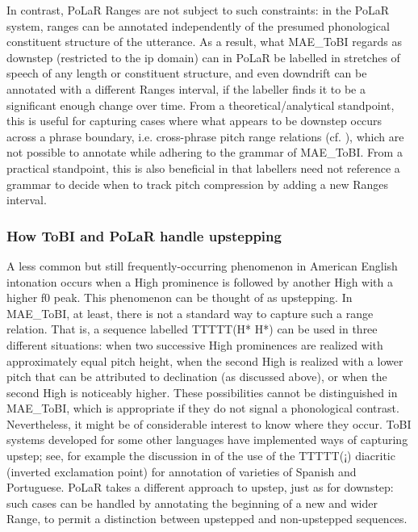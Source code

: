 \documentclass[11pt, twoside]{memoir}
\begin{document}
In contrast, PoLaR Ranges are not subject to such constraints: in the PoLaR system, ranges can be annotated independently of the presumed phonological constituent structure of the utterance. As a result, what MAE\_ToBI regards as downstep (restricted to the ip domain) can in PoLaR be labelled in stretches of speech of any length or constituent structure, and even downdrift can be annotated with a different Ranges interval, if the labeller finds it to be a significant enough change over time. From a theoretical\slash analytical standpoint, this is useful for capturing cases where what appears to be downstep occurs across a phrase boundary, i.e. cross-phrase pitch range relations (cf. \citealt{ladd88, brugos15}), which are not possible to annotate while adhering to the grammar of MAE\_ToBI. From a practical standpoint, this is also beneficial in that labellers need not reference a grammar to decide when to track pitch compression by adding a new Ranges interval.

\subsubsection{How ToBI and PoLaR handle upstepping}\label{sec:upstepping}
A less common but still frequently-occurring phenomenon in American English intonation occurs when a High prominence is followed by another High with a higher f0 peak.  This phenomenon can be thought of as upstepping. In MAE\_ToBI, at least, there is not a standard way to capture such a range relation.  That is, a sequence labelled TTTTT(H* H*) can be used in three different situations: when two successive High prominences are realized with approximately equal pitch height, when the second High is realized with a lower pitch that can be attributed to declination (as discussed above), or when the second High is noticeably higher. These possibilities cannot be distinguished in MAE\_ToBI, which is appropriate if they do not signal a phonological contrast. Nevertheless, it might be of considerable interest to know where they occur. ToBI systems developed for some other languages have implemented ways of capturing upstep; see, for example the discussion in \citet{armstrong-14} of the use of the TTTTT(¡) diacritic (inverted exclamation point) for annotation of varieties of Spanish and Portuguese. PoLaR takes a different approach to upstep, just as for downstep: such cases can be handled by annotating the beginning of a new and wider Range, to permit a distinction between upstepped and non-upstepped sequences.
\end{document}
